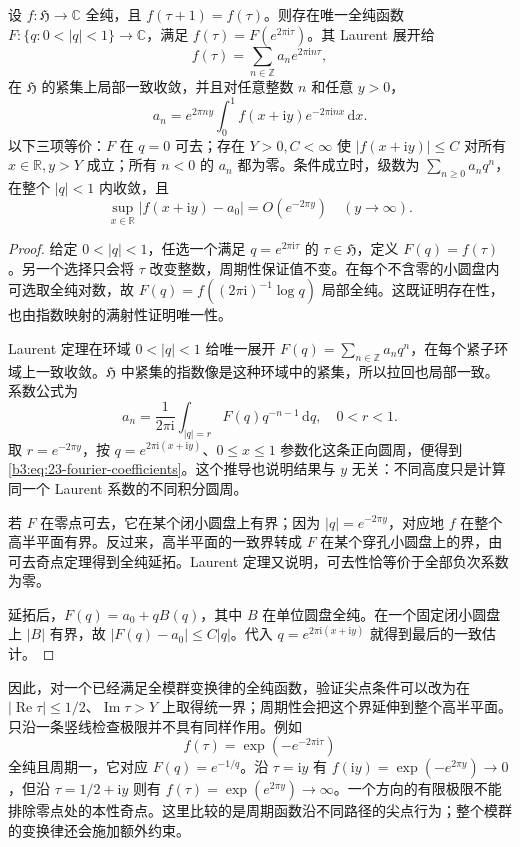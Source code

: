 \begin{proposition}[周期函数的尖点展开]\label{b3:prop:23-q-expansion}
设 \(f:\mathfrak H\to\mathbb C\) 全纯，且 \(f(\tau+1)=f(\tau)\)。则存在唯一全纯函数
\(F:\{q:0<|q|<1\}\to\mathbb C\)，满足 \(f(\tau)=F(e^{2\pi\mathrm{i}\tau})\)。其 Laurent 展开给
\[
 f(\tau)=\sum_{n\in\mathbb Z}a_ne^{2\pi\mathrm{i}n\tau},
\]
在 \(\mathfrak H\) 的紧集上局部一致收敛，并且对任意整数 \(n\) 和任意 \(y>0\)，
\begin{equation}\label{b3:eq:23-fourier-coefficients}
 a_n=e^{2\pi ny}\int_0^1
        f(x+\mathrm{i}y)e^{-2\pi\mathrm{i}nx}\,\mathrm{d}x.
\end{equation}
以下三项等价：\(F\) 在 \(q=0\) 可去；存在 \(Y>0,C<\infty\) 使 \(|f(x+\mathrm{i}y)|\le C\) 对所有 \(x\in\mathbb R,y>Y\) 成立；所有 \(n<0\) 的 \(a_n\) 都为零。条件成立时，级数为 \(\sum_{n\ge0}a_nq^n\)，在整个 \(|q|<1\) 内收敛，且
\[
 \sup_{x\in\mathbb R}|f(x+\mathrm{i}y)-a_0|
 =O(e^{-2\pi y})\quad(y\to\infty).
\]
\end{proposition}
\begin{proof}
给定 \(0<|q|<1\)，任选一个满足 \(q=e^{2\pi\mathrm{i}\tau}\) 的 \(\tau\in\mathfrak H\)，定义 \(F(q)=f(\tau)\)。另一个选择只会将 \(\tau\) 改变整数，周期性保证值不变。在每个不含零的小圆盘内可选取全纯对数，故 \(F(q)=f((2\pi\mathrm{i})^{-1}\log q)\) 局部全纯。这既证明存在性，也由指数映射的满射性证明唯一性。

Laurent 定理在环域 \(0<|q|<1\) 给唯一展开 \(F(q)=\sum_{n\in\mathbb Z}a_nq^n\)，在每个紧子环域上一致收敛。\(\mathfrak H\) 中紧集的指数像是这种环域中的紧集，所以拉回也局部一致。系数公式为
\[
 a_n=\frac1{2\pi\mathrm{i}}
        \int_{|q|=r}F(q)q^{-n-1}\,\mathrm{d}q,
 \quad 0<r<1.
\]
取 \(r=e^{-2\pi y}\)，按 \(q=e^{2\pi\mathrm{i}(x+\mathrm{i}y)}\)、\(0\le x\le1\) 参数化这条正向圆周，便得到\eqref{b3:eq:23-fourier-coefficients}。这个推导也说明结果与 \(y\) 无关：不同高度只是计算同一个 Laurent 系数的不同积分圆周。

若 \(F\) 在零点可去，它在某个闭小圆盘上有界；因为 \(|q|=e^{-2\pi y}\)，对应地 \(f\) 在整个高半平面有界。反过来，高半平面的一致界转成 \(F\) 在某个穿孔小圆盘上的界，由可去奇点定理得到全纯延拓。Laurent 定理又说明，可去性恰等价于全部负次系数为零。

延拓后，\(F(q)=a_0+qB(q)\)，其中 \(B\) 在单位圆盘全纯。在一个固定闭小圆盘上 \(|B|\) 有界，故 \(|F(q)-a_0|\le C|q|\)。代入 \(q=e^{2\pi\mathrm{i}(x+\mathrm{i}y)}\) 就得到最后的一致估计。
\end{proof}

因此，对一个已经满足全模群变换律的全纯函数，验证尖点条件可以改为在 \(|\operatorname{Re}\tau|\le1/2\)、\(\operatorname{Im}\tau>Y\) 上取得统一界；周期性会把这个界延伸到整个高半平面。只沿一条竖线检查极限并不具有同样作用。例如
\[
 f(\tau)=\exp(-e^{-2\pi\mathrm{i}\tau})
\]
全纯且周期一，它对应 \(F(q)=e^{-1/q}\)。沿 \(\tau=\mathrm{i}y\) 有 \(f(\mathrm{i}y)=\exp(-e^{2\pi y})\to0\)，但沿 \(\tau=1/2+\mathrm{i}y\) 则有 \(f(\tau)=\exp(e^{2\pi y})\to\infty\)。一个方向的有限极限不能排除零点处的本性奇点。这里比较的是周期函数沿不同路径的尖点行为；整个模群的变换律还会施加额外约束。

